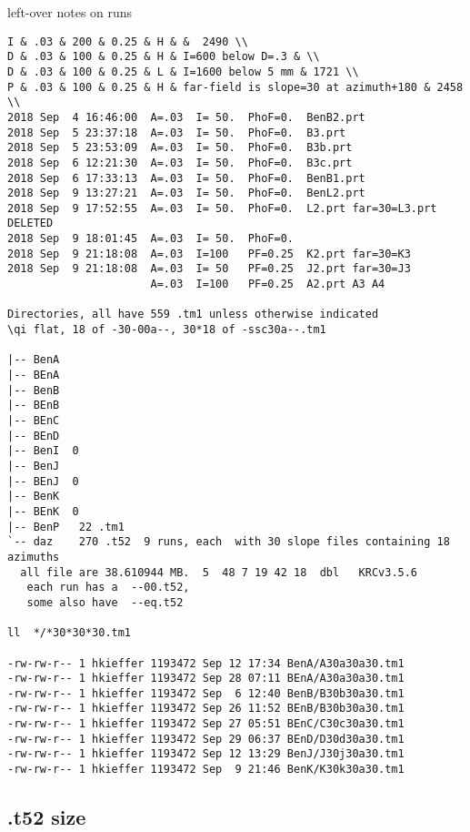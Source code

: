 \documentclass{article}
\begin{document}
left-over notes on runs
\vspace{-3.mm} 
\begin{verbatim}
I & .03 & 200 & 0.25 & H & &  2490 \\ 
D & .03 & 100 & 0.25 & H & I=600 below D=.3 & \\
D & .03 & 100 & 0.25 & L & I=1600 below 5 mm & 1721 \\
P & .03 & 100 & 0.25 & H & far-field is slope=30 at azimuth+180 & 2458 \\ 
2018 Sep  4 16:46:00  A=.03  I= 50.  PhoF=0.  BenB2.prt
2018 Sep  5 23:37:18  A=.03  I= 50.  PhoF=0.  B3.prt
2018 Sep  5 23:53:09  A=.03  I= 50.  PhoF=0.  B3b.prt
2018 Sep  6 12:21:30  A=.03  I= 50.  PhoF=0.  B3c.prt
2018 Sep  6 17:33:13  A=.03  I= 50.  PhoF=0.  BenB1.prt
2018 Sep  9 13:27:21  A=.03  I= 50.  PhoF=0.  BenL2.prt
2018 Sep  9 17:52:55  A=.03  I= 50.  PhoF=0.  L2.prt far=30=L3.prt DELETED    
2018 Sep  9 18:01:45  A=.03  I= 50.  PhoF=0. 
2018 Sep  9 21:18:08  A=.03  I=100   PF=0.25  K2.prt far=30=K3
2018 Sep  9 21:18:08  A=.03  I= 50   PF=0.25  J2.prt far=30=J3
                      A=.03  I=100   PF=0.25  A2.prt A3 A4

Directories, all have 559 .tm1 unless otherwise indicated
\qi flat, 18 of -30-00a--, 30*18 of -ssc30a--.tm1

|-- BenA
|-- BEnA
|-- BenB
|-- BEnB
|-- BEnC
|-- BEnD
|-- BenI  0
|-- BenJ
|-- BEnJ  0
|-- BenK
|-- BEnK  0
|-- BenP   22 .tm1
`-- daz    270 .t52  9 runs, each  with 30 slope files containing 18 azimuths
  all file are 38.610944 MB.  5  48 7 19 42 18  dbl   KRCv3.5.6
   each run has a  --00.t52, 
   some also have  --eq.t52

ll  */*30*30*30.tm1

-rw-rw-r-- 1 hkieffer 1193472 Sep 12 17:34 BenA/A30a30a30.tm1
-rw-rw-r-- 1 hkieffer 1193472 Sep 28 07:11 BEnA/A30a30a30.tm1
-rw-rw-r-- 1 hkieffer 1193472 Sep  6 12:40 BenB/B30b30a30.tm1
-rw-rw-r-- 1 hkieffer 1193472 Sep 26 11:52 BEnB/B30b30a30.tm1
-rw-rw-r-- 1 hkieffer 1193472 Sep 27 05:51 BEnC/C30c30a30.tm1
-rw-rw-r-- 1 hkieffer 1193472 Sep 29 06:37 BEnD/D30d30a30.tm1
-rw-rw-r-- 1 hkieffer 1193472 Sep 12 13:29 BenJ/J30j30a30.tm1
-rw-rw-r-- 1 hkieffer 1193472 Sep  9 21:46 BenK/K30k30a30.tm1

\end{verbatim}   
\subsection{.t52 size}
\end{document}
